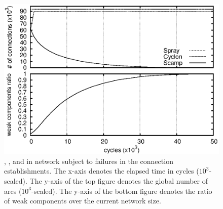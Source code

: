 \begin{figure}
  \centering \includegraphics[width=.8\textwidth]{img/spray/degen.eps}
  \caption{\label{fig:degeneration}\CYCLON, \SCAMP, and \SPRAY in network
    subject to failures in the connection establishments. The x-axis denotes
    the elapsed time in cycles ($10^3$-scaled). The y-axis of the top figure
    denotes the global number of arcs ($10^3$-scaled). The y-axis of the bottom
    figure denotes the ratio of weak components over the current network size.}
\end{figure}

